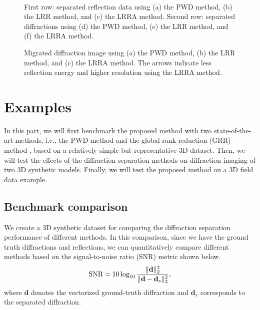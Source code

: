 \documentclass[10pt]{IEEEtran}
\begin{document}
\begin{figure}[htb!]
 \centering
  \\
\caption{First row: separated reflection data using (a) the PWD method, (b) the LRR method, and (c) the LRRA method. Second row: separated diffractions using (d) the PWD method, (e) the LRR method, and (f) the LRRA method.}
\label{fig:k-pwd,k-lrr,k-lrra,k-pwd-n-0,k-lrr-n-0,k-lrra-n-0}
\end{figure}

\begin{figure}[htb!]
 \centering
\caption{Migrated diffraction image using (a) the PWD method, (b) the LRR method, and (c) the LRRA method. The arrows indicate less reflection energy and higher resolution using the LRRA method.}
\label{fig:k-pwd-imag-0,k-lrr-imag-0,k-lrra-imag-0}
\end{figure}

\section{Examples}
In this part, we will first benchmark the proposed method with two state-of-the-art methods, i.e., the PWD method \cite{2007Post} and the global rank-reduction (GRR) method \cite{2020Diffraction}, based on a relatively simple but representative 3D dataset. Then, we will test the effects of the diffraction separation methods on diffraction imaging of two 3D synthetic models. Finally, we will test the proposed method on a 3D field data example. 

\subsection{Benchmark comparison}
We create a 3D synthetic dataset for comparing the diffraction separation performance of different methods. In this comparison, since we have the ground truth diffractions and reflections, we can quantitatively compare different methods based on the signal-to-noise ratio (SNR) metric shown below.
\begin{equation}
\label{eq:snr}
\text{SNR}=10\log_{10}\frac{\Arrowvert \mathbf{d} \Arrowvert_2^2}{\Arrowvert \mathbf{d} -\mathbf{d}_s\Arrowvert_2^2},
\end{equation}
where $\mathbf{d}$ denotes the vectorized ground-truth diffraction and $\mathbf{d}_s$ corresponds to the separated diffraction.  
\end{document}
